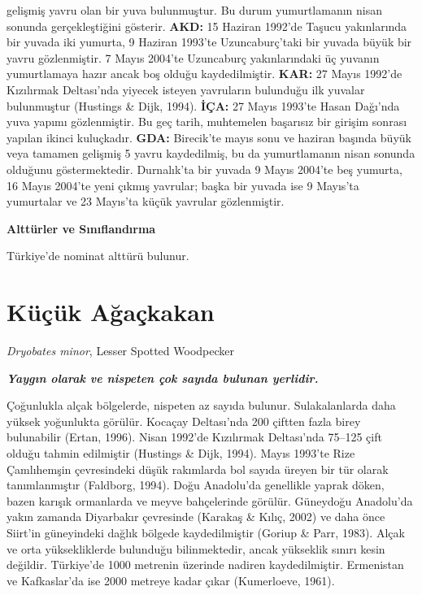 \documentclass[
  10.5pt,
  a4paper,
  DIV=11,
  numbers=noendperiod,
  twocolumn]{scrreprt}
\begin{document}
gelişmiş yavru olan bir yuva bulunmuştur. Bu durum yumurtlamanın nisan
sonunda gerçekleştiğini gösterir. \textbf{AKD:} 15 Haziran 1992'de
Taşucu yakınlarında bir yuvada iki yumurta, 9 Haziran 1993'te
Uzuncaburç'taki bir yuvada büyük bir yavru gözlenmiştir. 7 Mayıs 2004'te
Uzuncaburç yakınlarındaki üç yuvanın yumurtlamaya hazır ancak boş olduğu
kaydedilmiştir. \textbf{KAR:} 27 Mayıs 1992'de Kızılırmak Deltası'nda
yiyecek isteyen yavruların bulunduğu ilk yuvalar bulunmuştur (Hustings
\& Dijk, 1994). \textbf{İÇA:} 27 Mayıs 1993'te Hasan Dağı'nda yuva
yapımı gözlenmiştir. Bu geç tarih, muhtemelen başarısız bir girişim
sonrası yapılan ikinci kuluçkadır. \textbf{GDA:} Birecik'te mayıs sonu
ve haziran başında büyük veya tamamen gelişmiş 5 yavru kaydedilmiş, bu
da yumurtlamanın nisan sonunda olduğunu göstermektedir. Durnalık'ta bir
yuvada 9 Mayıs 2004'te beş yumurta, 16 Mayıs 2004'te yeni çıkmış
yavrular; başka bir yuvada ise 9 Mayıs'ta yumurtalar ve 23 Mayıs'ta
küçük yavrular gözlenmiştir.

\textbf{Alttürler ve Sınıflandırma}

Türkiye'de nominat alttürü bulunur.

\section{Küçük Ağaçkakan}\label{kuxfcuxe7uxfck-aux11fauxe7kakan}

\emph{Dryobates minor}, Lesser Spotted Woodpecker

\textbf{\emph{Yaygın olarak ve nispeten çok sayıda bulunan yerlidir.}}

Çoğunlukla alçak bölgelerde, nispeten az sayıda bulunur. Sulakalanlarda
daha yüksek yoğunlukta görülür. Kocaçay Deltası'nda 200 çiftten fazla
birey bulunabilir (Ertan, 1996). Nisan 1992'de Kızılırmak Deltası'nda
75--125 çift olduğu tahmin edilmiştir (Hustings \& Dijk, 1994). Mayıs
1993'te Rize Çamlıhemşin çevresindeki düşük rakımlarda bol sayıda üreyen
bir tür olarak tanımlanmıştır (Faldborg, 1994). Doğu Anadolu'da
genellikle yaprak döken, bazen karışık ormanlarda ve meyve bahçelerinde
görülür. Güneydoğu Anadolu'da yakın zamanda Diyarbakır çevresinde
(Karakaş \& Kılıç, 2002) ve daha önce Siirt'in güneyindeki dağlık
bölgede kaydedilmiştir (Goriup \& Parr, 1983). Alçak ve orta
yüksekliklerde bulunduğu bilinmektedir, ancak yükseklik sınırı kesin
değildir. Türkiye'de 1000 metrenin üzerinde nadiren kaydedilmiştir.
Ermenistan ve Kafkaslar'da ise 2000 metreye kadar çıkar (Kumerloeve,
1961).
\end{document}
